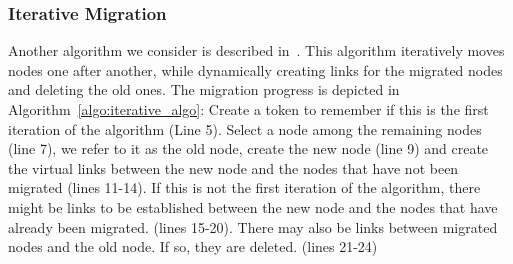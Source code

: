 \subsubsection{Iterative Migration}
Another algorithm we consider is described in~\cite{vnm-lo2013}.
This algorithm iteratively moves nodes one after another, while dynamically creating links for the migrated nodes and deleting the old ones.
The migration progress is depicted in Algorithm~\ref{algo:iterative_algo}:
Create a token to remember if this is the first iteration of the algorithm (Line 5).
Select a node among the remaining nodes (line 7), we refer to it as the old node, create the new node (line 9) and create the virtual links between the new node and the nodes that have not been migrated (lines 11-14).
If this is not the first iteration of the algorithm, there might be links to be established between the new node and the nodes that have already been migrated. (lines 15-20).
There may also be links between migrated nodes and the old node.
If so, they are deleted. (lines 21-24)



